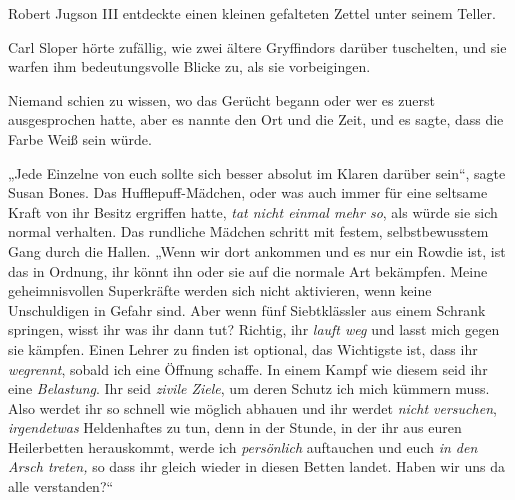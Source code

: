 Robert Jugson III entdeckte einen kleinen gefalteten Zettel unter seinem Teller.

Carl Sloper hörte zufällig, wie zwei ältere Gryffindors darüber tuschelten, und sie warfen ihm bedeutungsvolle Blicke zu, als sie vorbeigingen.

Niemand schien zu wissen, wo das Gerücht begann oder wer es zuerst ausgesprochen hatte, aber es nannte den Ort und die Zeit, und es sagte, dass die Farbe Weiß sein würde.

\later

„Jede Einzelne von euch sollte sich besser absolut im Klaren darüber sein“, sagte Susan Bones. Das Hufflepuff-Mädchen, oder was auch immer für eine seltsame Kraft von ihr Besitz ergriffen hatte, \emph{tat nicht einmal mehr so}, als würde sie sich normal verhalten. Das rundliche Mädchen schritt mit festem, selbstbewusstem Gang durch die Hallen. „Wenn wir dort ankommen und es nur ein Rowdie ist, ist das in Ordnung, ihr könnt ihn oder sie auf die normale Art bekämpfen. Meine geheimnisvollen Superkräfte werden sich nicht aktivieren, wenn keine Unschuldigen in Gefahr sind. Aber wenn fünf Siebtklässler aus einem Schrank springen, wisst ihr was ihr dann tut? Richtig, ihr \emph{lauft weg} und lasst mich gegen sie kämpfen. Einen Lehrer zu finden ist optional, das Wichtigste ist, dass ihr \emph{wegrennt}, sobald ich eine Öffnung schaffe. In einem Kampf wie diesem seid ihr eine \emph{Belastung}. Ihr seid \emph{zivile Ziele}, um deren Schutz ich mich kümmern muss. Also werdet ihr so schnell wie möglich abhauen und ihr werdet \emph{nicht versuchen}, \emph{irgendetwas} Heldenhaftes zu tun, denn in der Stunde, in der ihr aus euren Heilerbetten herauskommt, werde ich \emph{persönlich} auftauchen und euch \emph{in den Arsch treten,} so dass ihr gleich wieder in diesen Betten landet. Haben wir uns da alle verstanden?“

